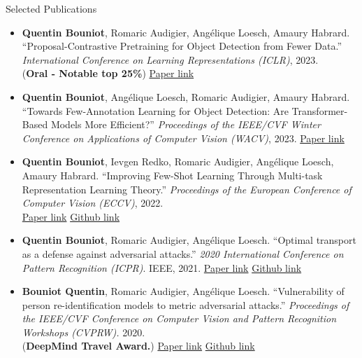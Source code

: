 \documentclass{resume} %
\begin{document}
\begin{rSection}{Selected Publications}
\begin{itemize}[label=$\cdot$]
        \item \textbf{Quentin Bouniot}, Romaric Audigier, Angélique Loesch, Amaury Habrard. ``Proposal-Contrastive Pretraining for Object Detection from Fewer Data.'' \emph{International Conference on Learning Representations (ICLR)}, 2023. \\ (\textbf{Oral - Notable top 25\%}) \href{https://openreview.net/forum?id=gm0VZ-h-hPy}{Paper link}

        \item \textbf{Quentin Bouniot}, Angélique Loesch, Romaric Audigier, Amaury Habrard. ``Towards Few-Annotation Learning for Object Detection: Are Transformer-Based Models More Efficient?'' \emph{Proceedings of the IEEE/CVF Winter Conference on Applications of Computer Vision (WACV)}, 2023. \href{https://openaccess.thecvf.com/content/WACV2023/html/Bouniot_Towards_Few-Annotation_Learning_for_Object_Detection_Are_Transformer-Based_Models_More_WACV_2023_paper.html}{Paper link}

        \item \textbf{Quentin Bouniot}, Ievgen Redko, Romaric Audigier, Angélique Loesch, Amaury Habrard. ``Improving Few-Shot Learning Through Multi-task Representation Learning Theory.'' \emph{Proceedings of the European Conference of Computer Vision (ECCV)}, 2022. \\ \href{https://arxiv.org/abs/2010.01992}{Paper link} \href{https://github.com/CEA-LIST/MetaMTReg}{Github link}

        \item \textbf{Quentin Bouniot}, Romaric Audigier, Angélique Loesch. ``Optimal transport as a defense against adversarial attacks.'' \emph{2020 International Conference on Pattern Recognition (ICPR)}. IEEE, 2021. \href{https://arxiv.org/abs/2102.03156}{Paper link} \href{https://github.com/CEA-LIST/adv-sat}{Github link}

        \item \textbf{Bouniot Quentin}, Romaric Audigier, Angélique Loesch. ``Vulnerability of person re-identification models to metric adversarial attacks.'' \emph{Proceedings of the IEEE/CVF Conference on Computer Vision and Pattern Recognition Workshops (CVPRW).} 2020. \\ (\textbf{DeepMind Travel Award.}) \href{https://openaccess.thecvf.com/content_CVPRW_2020/html/w47/Bouniot_Vulnerability_of_Person_Re-Identification_Models_to_Metric_Adversarial_Attacks_CVPRW_2020_paper.html}{Paper link} \href{https://github.com/CEA-LIST/adv-reid}{Github link}
    \end{itemize}


\end{rSection}
\end{document}
